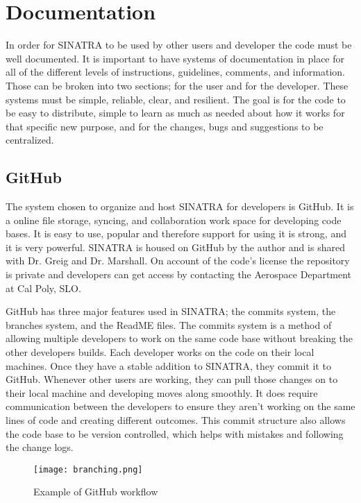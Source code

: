 \section{Documentation}
In order for SINATRA to be used by other users and developer the code must be well documented. It is important to have systems of documentation in place for all of the different levels of instructions, guidelines, comments, and information. Those can be broken into two sections; for the user and for the developer. These systems must be simple, reliable, clear, and resilient. The goal is for the code to be easy to distribute, simple to learn as much as needed about how it works for that specific new purpose, and for the changes, bugs and suggestions to be centralized.

\subsection{GitHub}
The system chosen to organize and host SINATRA for developers is GitHub. It is a online file storage, syncing, and collaboration work space for developing code bases. It is easy to use, popular and therefore support for using it is strong, and it is very powerful. SINATRA is housed on GitHub by the author and is shared with Dr. Greig and Dr. Marshall. On account of the code's license the repository is private and developers can get access by contacting the Aerospace Department at Cal Poly, SLO. \par
\indent GitHub has three major features used in SINATRA; the commits system, the branches system, and the ReadME files. The commits system is a method of allowing multiple developers to work on the same code base without breaking the other developers builds. Each developer works on the code on their local machines. Once they have a stable addition to SINATRA, they commit it to GitHub. Whenever other users are working, they can pull those changes on to their local machine and developing moves along smoothly. It does require communication between the developers to ensure they aren't working on the same lines of code and creating different outcomes. This commit structure also allows the code base to be version controlled, which helps with mistakes and following the change logs. \par


\begin{figure}
\texttt{[image: branching.png]}
\centering
\caption{Example of GitHub workflow}
\label{fig:github}
\end{figure}


